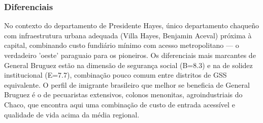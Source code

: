 \subsubsection*{Diferenciais}\label{dif-general-bruguez-1509}
No contexto do departamento de Presidente Hayes, único departamento chaqueño com infraestrutura urbana adequada (Villa Hayes, Benjamin Aceval) próxima à capital, combinando custo fundiário mínimo com acesso metropolitano — o verdadeiro 'oeste' paraguaio para os pioneiros. Os diferenciais mais marcantes de General Bruguez estão na dimensão de segurança social (B=8.3) e na de solidez institucional (E=7.7), combinação pouco comum entre distritos de GSS equivalente. O perfil de imigrante brasileiro que melhor se beneficia de General Bruguez é o de pecuaristas extensivos, colonos menonitas, agroindustriais do Chaco, que encontra aqui uma combinação de custo de entrada acessível e qualidade de vida acima da média regional.
